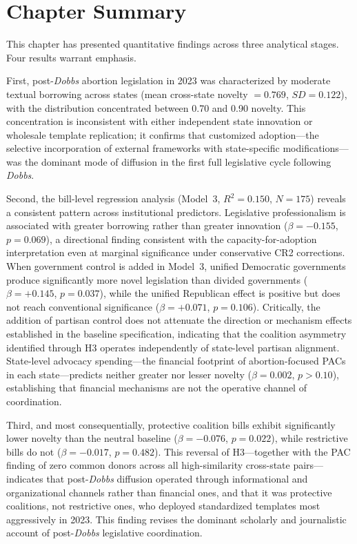 \section{Chapter Summary}
\label{sec:findings_summary}

This chapter has presented quantitative findings across three analytical stages. Four results warrant emphasis.

First, post-\emph{Dobbs} abortion legislation in 2023 was characterized by moderate textual borrowing across states (mean cross-state novelty $= 0.769$, $SD = 0.122$), with the distribution concentrated between 0.70 and 0.90 novelty. This concentration is inconsistent with either independent state innovation or wholesale template replication; it confirms that customized adoption---the selective incorporation of external frameworks with state-specific modifications---was the dominant mode of diffusion in the first full legislative cycle following \emph{Dobbs}.

Second, the bill-level regression analysis (Model~3, $R^2 = 0.150$, $N = 175$) reveals a consistent pattern across institutional predictors. Legislative professionalism is associated with greater borrowing rather than greater innovation ($\beta = -0.155$, $p = 0.069$), a directional finding consistent with the capacity-for-adoption interpretation even at marginal significance under conservative CR2 corrections. When government control is added in Model~3, unified Democratic governments produce significantly more novel legislation than divided governments ($\beta = +0.145$, $p = 0.037$), while the unified Republican effect is positive but does not reach conventional significance ($\beta = +0.071$, $p = 0.106$). Critically, the addition of partisan control does not attenuate the direction or mechanism effects established in the baseline specification, indicating that the coalition asymmetry identified through H3 operates independently of state-level partisan alignment. State-level advocacy spending---the financial footprint of abortion-focused PACs in each state---predicts neither greater nor lesser novelty ($\beta = 0.002$, $p > 0.10$), establishing that financial mechanisms are not the operative channel of coordination.

Third, and most consequentially, protective coalition bills exhibit significantly lower novelty than the neutral baseline ($\beta = -0.076$, $p = 0.022$), while restrictive bills do not ($\beta=-0.017$, $p=0.482$). This reversal of H3---together with the PAC finding of zero common donors across all high-similarity cross-state pairs---indicates that post-\emph{Dobbs} diffusion operated through informational and organizational channels rather than financial ones, and that it was protective coalitions, not restrictive ones, who deployed standardized templates most aggressively in 2023. This finding revises the dominant scholarly and journalistic account of post-\emph{Dobbs} legislative coordination.

